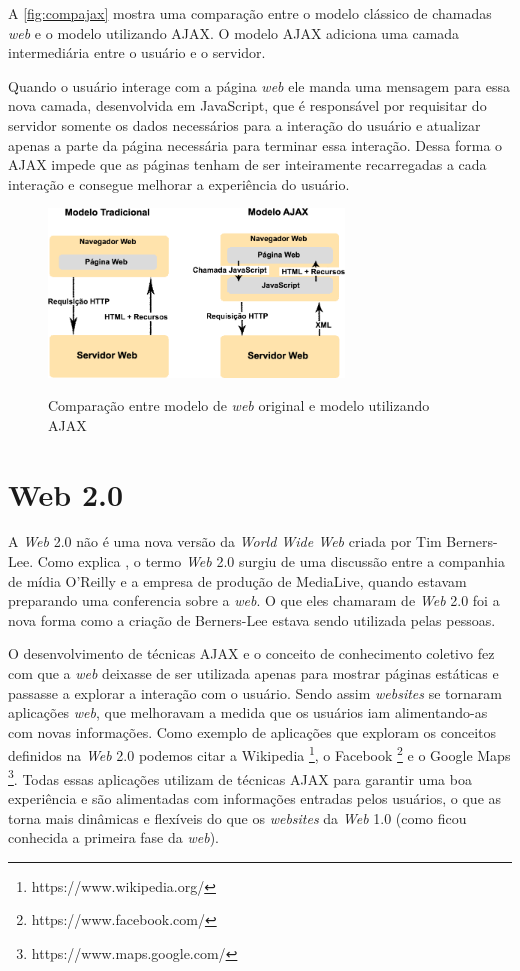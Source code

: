 A \autoref{fig:compajax} mostra uma comparação entre o modelo clássico de chamadas \textit{web} e o modelo utilizando AJAX. O modelo AJAX adiciona uma camada intermediária entre o usuário e o servidor.

Quando o usuário interage com a página \textit{web} ele manda uma mensagem para essa nova camada, desenvolvida em JavaScript, que é responsável por requisitar do servidor somente os dados necessários para a interação do usuário e atualizar apenas a parte da página necessária para terminar essa interação. Dessa forma o AJAX impede que as páginas tenham de ser inteiramente recarregadas a cada interação e consegue melhorar a experiência do usuário.

\begin{figure}[!htb]
    \centering
    \caption{Comparação entre modelo de \textit{web} original e modelo utilizando AJAX}
    \includegraphics[width=0.7\textwidth]{./04-figuras/fund-teorica/comparacao_ajax}
    \label{fig:compajax}
\end{figure}


\section{Web 2.0}
\label{sec:web20}
A \textit{Web} 2.0 não é uma nova versão da \textit{World Wide Web} criada por Tim Berners-Lee. Como explica , o termo \textit{Web} 2.0 surgiu de uma discussão entre a companhia de mídia O'Reilly e a empresa de produção de MediaLive, quando estavam preparando uma conferencia sobre a \textit{web}. O que eles chamaram de \textit{Web} 2.0 foi a nova forma como a criação de Berners-Lee estava sendo utilizada pelas pessoas.

O desenvolvimento de técnicas AJAX e o conceito de conhecimento coletivo fez com que a \textit{web} deixasse de ser utilizada apenas para mostrar páginas estáticas e passasse a explorar a interação com o usuário. Sendo assim \textit{websites} se tornaram aplicações \textit{web}, que melhoravam a medida que os usuários iam alimentando-as com novas informações. Como exemplo de aplicações que exploram os conceitos definidos na \textit{Web} 2.0 podemos citar a Wikipedia \footnote{https://www.wikipedia.org/}, o Facebook \footnote{https://www.facebook.com/} e o Google Maps \footnote{https://www.maps.google.com/}. Todas essas aplicações utilizam de técnicas AJAX para garantir uma boa experiência e são alimentadas com informações entradas pelos usuários, o que as torna mais dinâmicas e flexíveis do que os \textit{websites} da \textit{Web} 1.0 (como ficou conhecida a primeira fase da \textit{web}).